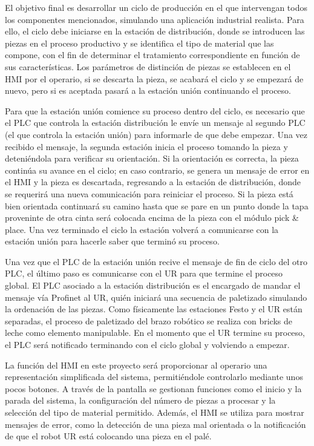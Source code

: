 El objetivo final es desarrollar un ciclo de producción en el que intervengan todos los componentes mencionados, simulando una aplicación industrial realista. Para ello, el ciclo debe iniciarse en la estación de distribución, donde se introducen las piezas en el proceso productivo y se identifica el tipo de material que las compone, con el fin de determinar el tratamiento correspondiente en función de sus características. Los parámetros de distinción de piezas se establecen en el HMI por el operario, si se descarta la pieza, se acabará el ciclo y se empezará de nuevo, pero si es aceptada pasará a la estación unión continuando el proceso. 

Para que la estación unión comience su proceso dentro del ciclo, es necesario que el PLC que controla la estación distribución le envíe un mensaje al segundo PLC (el que controla la estación unión) para informarle de que debe empezar.  Una vez recibido el mensaje, la segunda estación inicia el proceso tomando la pieza y deteniéndola para verificar su orientación. Si la orientación es correcta, la pieza continúa su avance en el ciclo; en caso contrario, se genera un mensaje de error en el HMI y la pieza es descartada, regresando a la estación de distribución, donde se requerirá una nueva comunicación para reiniciar el proceso. Si la pieza está bien orientada continuará su camino hasta que se pare en un punto donde la tapa proveninte de otra cinta será colocada encima de la pieza con el módulo pick \& place. Una vez terminado el ciclo la estación volverá a comunicarse con la estación unión para hacerle saber que terminó su proceso.

Una vez que el PLC de la estación unión recive el mensaje de fin de ciclo del otro PLC, el último paso es comunicarse con el UR para que termine el proceso global. El PLC asociado a la estación distribución es el encargado de mandar el mensaje vía Profinet al UR, quién iniciará una secuencia de paletizado simulando la ordenación de las piezas. Como físicamente las estaciones Festo y el UR están separadas, el proceso de paletizado del brazo robótico se realiza con bricks de leche como elemento manipulable. En el momento que el UR termine su proceso, el PLC será notificado terminando con el ciclo global y volviendo a empezar.

La función del HMI en este proyecto será proporcionar al operario una representación simplificada del sistema, permitiéndole controlarlo mediante unos pocos botones. A través de la pantalla se gestionan funciones como el inicio y la parada del sistema, la configuración del número de piezas a procesar y la selección del tipo de material permitido. Además, el HMI se utiliza para mostrar mensajes de error, como la detección de una pieza mal orientada o la notificación de que el robot UR está colocando una pieza en el palé.

